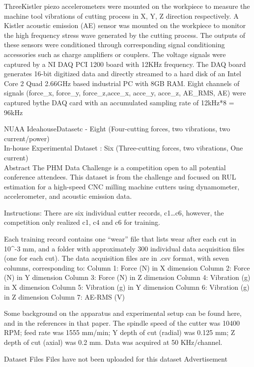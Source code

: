 \documentclass[sn-basic]{sn-jnl} %
\begin{document}
ThreeKistler piezo accelerometers were mounted on the
workpiece to measure the machine tool vibrations of cutting
process in X, Y, Z direction respectively. A Kistler acoustic
emission (AE) sensor was mounted on the workpiece to
monitor the high frequency stress wave generated by the
cutting process.
The outputs of these sensors were conditioned through
corresponding signal conditioning accessories such as
charge amplifiers or couplers. The voltage signals were
captured by a NI DAQ PCI 1200 board with 12KHz
frequency. The DAQ board generates 16-bit digitized data
and directly streamed to a hard disk of an Intel Core 2 Quad
2.66GHz based industrial PC with 8GB RAM.
Eight channels of signals (force_x, force_y, force_z,acce_x, acce_y, acce_z, AE_RMS, AE) were captured bythe DAQ card with an accumulated sampling rate of
12kHz*8 = 96kHz 


NUAA IdeahouseDatasetc - Eight  (Four-cutting forces, two vibrations, two current/power)\\
In-house Experimental Dataset : Six (Three-cutting forces, two vibrations, One current)\\
Abstract
The PHM Data Challenge is a competition open to all potential conference attendees. This dataset is from the challenge and focused on RUL estimation for a high-speed CNC milling machine cutters using dynamometer, accelerometer, and acoustic emission data.

Instructions:
There are six individual cutter records, c1…c6, however, the competition only realized c1, c4 and c6 for training.

Each training record contains one “wear” file that lists wear after each cut in 10^-3 mm, and a folder with approximately 300 individual data acquisition files (one for each cut). The data acquisition files are in .csv format, with seven columns, corresponding to:
Column 1: Force (N) in X dimension
Column 2: Force (N) in Y dimension
Column 3: Force (N) in Z dimension
Column 4: Vibration (g) in X dimension
Column 5: Vibration (g) in Y dimension
Column 6: Vibration (g) in Z dimension
Column 7: AE-RMS (V)

Some background on the apparatus and experimental setup can be found here, and in the references in that paper. The spindle speed of the cutter was 10400 RPM; feed rate was 1555 mm/min; Y depth of cut (radial) was 0.125 mm; Z depth of cut (axial) was 0.2 mm. Data was acquired at 50 KHz/channel.

Dataset Files
Files have not been uploaded for this dataset
Advertisement
\end{document}
